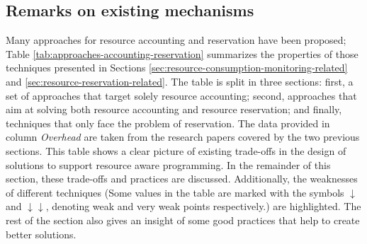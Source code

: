\subsection{Remarks on existing mechanisms} \label{sec:discussion-related-work}

Many approaches for resource accounting and reservation have been proposed; Table \ref{tab:approaches-accounting-reservation} summarizes the properties of those techniques presented in Sections \ref{sec:resource-consumption-monitoring-related} and \ref{sec:resource-reservation-related}.
The table is split in three sections: first, a set of approaches that target solely resource accounting; second, approaches that aim at solving both resource accounting and resource reservation; and finally, techniques that only face the problem of reservation.
The data provided in column \textit{Overhead} are taken from the research papers covered by the two previous sections.
This table shows a clear picture of existing trade-offs in the design of solutions to support resource aware programming.
In the remainder of this section, these trade-offs and practices are discussed.
Additionally, the weaknesses of different techniques (Some values in the table are marked with the symbols $ \downarrow $ and $\downarrow\downarrow$, denoting weak and very weak points respectively.) are highlighted.
The rest of the section also gives an insight of some good practices that help to create better solutions.

\newcommand{\weakp}{$\downarrow \downarrow$}
\newcommand{\weak}{$\downarrow$}

